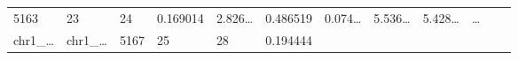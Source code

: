 \documentclass[
]{article}
\begin{document}
\begin{longtable}[]{@{}llllllllllll@{}}
\begin{minipage}[t]{0.06\columnwidth}
5163\strut
\end{minipage} & \begin{minipage}[t]{0.06\columnwidth}\raggedright
23\strut
\end{minipage} & \begin{minipage}[t]{0.06\columnwidth}\raggedright
24\strut
\end{minipage} & \begin{minipage}[t]{0.06\columnwidth}\raggedright
0.169014\strut
\end{minipage} & \begin{minipage}[t]{0.08\columnwidth}\raggedright
2.826\ldots{}\strut
\end{minipage} & \begin{minipage}[t]{0.06\columnwidth}\raggedright
0.486519\strut
\end{minipage} & \begin{minipage}[t]{0.06\columnwidth}\raggedright
0.074\ldots{}\strut
\end{minipage} & \begin{minipage}[t]{0.09\columnwidth}\raggedright
5.536\ldots{}\strut
\end{minipage} & \begin{minipage}[t]{0.06\columnwidth}\raggedright
5.428\ldots{}\strut
\end{minipage} & \begin{minipage}[t]{0.02\columnwidth}\raggedright
\ldots{}\strut
\end{minipage}\tabularnewline
\begin{minipage}[t]{0.06\columnwidth}\raggedright
chr1\_\ldots{}\strut
\end{minipage} & \begin{minipage}[t]{0.06\columnwidth}\raggedright
chr1\_\ldots{}\strut
\end{minipage} & \begin{minipage}[t]{0.06\columnwidth}\raggedright
5167\strut
\end{minipage} & \begin{minipage}[t]{0.06\columnwidth}\raggedright
25\strut
\end{minipage} & \begin{minipage}[t]{0.06\columnwidth}\raggedright
28\strut
\end{minipage} & \begin{minipage}[t]{0.06\columnwidth}\raggedright
0.194444\strut
\end{minipage} & \begin{minipage}[t]{0.08\columnwidth}\raggedright

\end{minipage}
\end{longtable}
\end{document}
